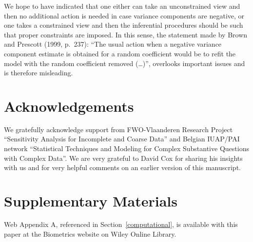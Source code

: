 \documentclass[useAMS,usenatbib,referee]{biom}
\begin{document}
We hope to have indicated that one either can take an unconstrained
view and then no additional action is needed in case variance
components are negative, or one takes a constrained view and then the
inferential procedures should be such that proper constraints are
imposed.  In this sense, the statement made by Brown and Prescott
(1999, p.~237): ``The usual action when a negative variance component
estimate is obtained for a random coefficient would be to refit the
model with the random coefficient removed (\dots)'', overlooks
important issues and is therefore misleading.

\backmatter


\section*{Acknowledgements}
We gratefully acknowledge support from FWO-Vlaanderen Research Project
``Sensitivity Analysis for Incomplete and Coarse Data'' and Belgian
IUAP/PAI network ``Statistical Techniques and Modeling for Complex
Substantive Questions with Complex Data''. We are very grateful to
David Cox for sharing his insights with us and for very helpful
comments on an earlier version of this manuscript.


\section*{Supplementary Materials}
Web Appendix A, referenced in Section~\ref{computational}, is available with
this paper at the Biometrics website on Wiley Online Library.
\vspace*{-8pt}


\end{document}
